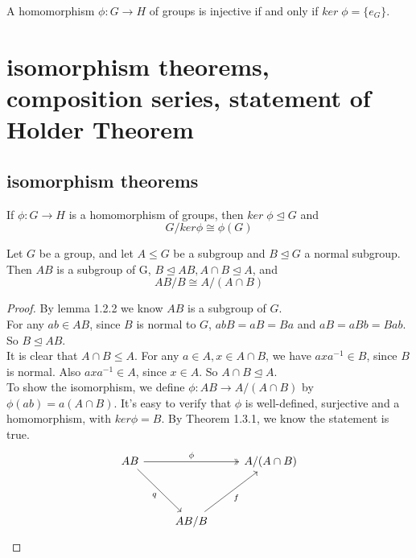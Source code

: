 \documentclass[11pt,fleqn]{book} %
\begin{document}
\begin{CJK}{UTF8}{gkai}
\begin{lemma}
	A homomorphism $\phi: G \to H$ of groups is injective if and only if $ker \; \phi = \{e_G\}$.
\end{lemma}

\section{isomorphism theorems, composition series, statement of Holder Theorem}
\subsection{isomorphism theorems}

\begin{theorem}
	 If $\phi: G \to H$ is a homomorphism of groups, then $ker \; \phi \unlhd G$ and \[
		G / ker \phi \cong \phi(G) \]
\end{theorem}

\begin{theorem}
	 Let $G$ be a group, and let $A \leq G$ be a subgroup and $B \unlhd G$ a normal subgroup. Then $AB$ is a subgroup of G, $B \unlhd AB, A\cap B \unlhd A$, and 
	\[AB/B \cong A/(A\cap B)\]
\end{theorem}
\begin{proof}
	By lemma 1.2.2 we know $AB$ is a subgroup of $G$. \\
	For any $ab \in AB$, since $B$ is normal to $G$, $abB = aB = Ba$ and $aB = aBb = Bab$. So $B \unlhd AB$. \\
	It is clear that $A\cap B \leq A$. For any $a \in A, x \in A\cap B$, we have $axa^{-1} \in B$, since $B$ is normal. Also $axa^{-1} \in A$, since $x \in A$. So $A \cap B \unlhd A$. \\
	To show the isomorphism, we define $\phi: AB \to A/(A\cap B)$ by $\phi(ab) = a(A\cap B)$. It's easy to verify that $\phi$ is well-defined, surjective and a homomorphism, with $ker \phi = B$. By Theorem 1.3.1, we know the statement is true.
	\[\begin{tikzcd}
		AB && {A/(A\cap B)} \\
		\\
		& {AB/B}
		\arrow["\phi", two heads, from=1-1, to=1-3]
		\arrow["q"', from=1-1, to=3-2]
		\arrow["f"', from=3-2, to=1-3]
	\end{tikzcd}\]
\end{proof}


\end{CJK}
\end{document}

